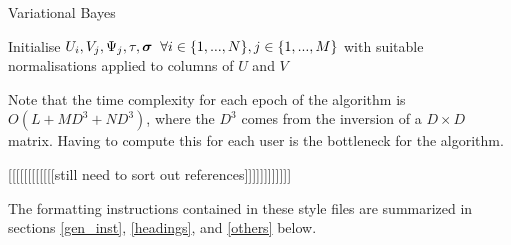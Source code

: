 \documentclass{article}
\theoremstyle{plain}
\begin{document}
\newpage
\begin{algorithm}
    \SetAlgoNoLine
    \caption{Variational Bayes}
        \BlankLine
        Initialise $U_i,V_j,\Psi_j,\tau,\boldsymbol{\sigma} \hspace{2mm} \forall i\in \{1,...,N\},j\in \{1,...,M\}$ with suitable normalisations applied to columns of $U$ and $V$ \;
\end{algorithm}
Note that the time complexity for each epoch of the algorithm is $O(L+MD^3+ND^3)$, where the $D^3$ comes from the inversion of a $D \times D$ matrix. Having to compute this for each user is the bottleneck for the algorithm.







\iffalse

[[[[[[[[[[[[still need to sort out references]]]]]]]]]]]]

The formatting instructions contained in these style files are summarized in
sections \ref{gen_inst}, \ref{headings}, and \ref{others} below.
\end{document}
